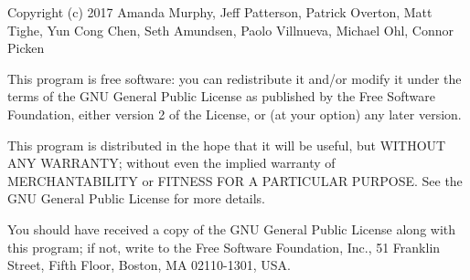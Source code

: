 \begin{center}
  \noindent Copyright (c) 2017
    Amanda Murphy, Jeff Patterson, Patrick Overton,
    Matt Tighe, Yun Cong Chen, Seth Amundsen,
    Paolo Villnueva, Michael Ohl, Connor Picken

\end{center}
    \bigskip



\noindent This program is free software: you can redistribute it and/or modify
it under the terms of the GNU General Public License as published by
the Free Software Foundation, either version 2 of the License, or
(at your option) any later version.

This program is distributed in the hope that it will be useful,
but WITHOUT ANY WARRANTY; without even the implied warranty of
MERCHANTABILITY or FITNESS FOR A PARTICULAR PURPOSE. See the
GNU General Public License for more details.

You should have received a copy of the GNU General Public License
along with this program; if not, write to the Free Software
Foundation, Inc., 51 Franklin Street, Fifth Floor, Boston, MA 02110-1301, USA.
